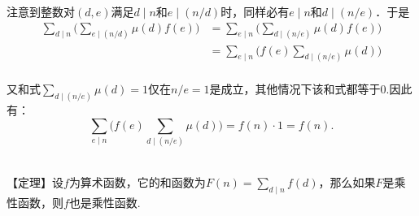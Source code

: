         注意到整数对$(d,e)$满足$d\mid n$和$e\mid (n/d)$时，同样必有$e\mid n$和$d\mid (n/e)$．于是
        \[
            \begin{aligned} 
                \sum_{d\mid n}\biggl(\sum_{e\mid (n/d)}\mu(d)f(e)\biggr)&=\sum_{e\mid n}\biggl(\sum_{d\mid (n/e)}\mu(d)f(e)\biggr)\\
                                          &=\sum_{e\mid n}\biggl(f(e)\sum_{d\mid (n/e)}\mu(d)\biggr)\\
            \end{aligned}            
        \]
        
        又和式$\sum \limits_{d\mid (n/e)} \mu(d)=1$仅在$n/e=1$是成立，其他情况下该和式都等于0.因此有：
        \[\sum_{e\mid n}\biggl(f(e)\sum_{d\mid (n/e)}\mu(d)\biggr)=f(n)\cdot1=f(n).\]\\
        \vspace{5em}

        【定理】设$f$为算术函数，它的和函数为$F(n) = \sum \limits_{d\mid n}f(d)$，那么如果$F$是乘性函数，则$f$也是乘性函数.







